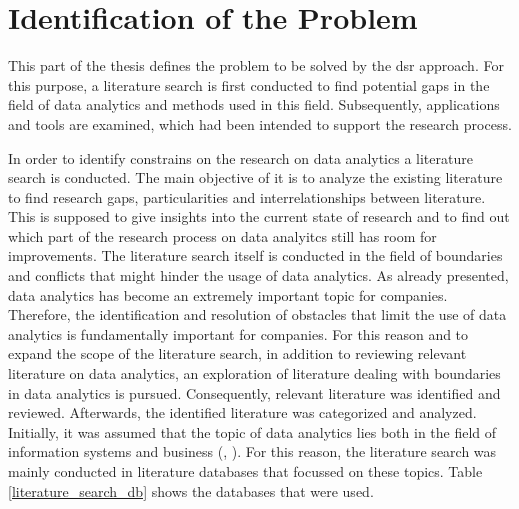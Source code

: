 \newpage\section{Identification of the Problem}\label{sec:identification_of_the_problem}

This part of the thesis defines the problem to be solved by the \ac{dsr} approach. For this purpose, a literature search is first conducted to find potential gaps in the field of data analytics and methods used in this field. Subsequently, applications and tools are examined, which had been intended to support the research process.

In order to identify constrains on the research on data analytics a literature search is conducted. The main objective of it is to analyze the existing literature to find research gaps, particularities and interrelationships between literature. This is supposed to give insights into the current state of research and to find out which part of the research process on data analyitcs still has room for improvements. The literature search itself is conducted in the field of boundaries and conflicts that might hinder the usage of data analytics. As already presented, data analytics has become an extremely important topic for companies. Therefore, the identification and resolution of obstacles that limit the use of data analytics is fundamentally important for companies. For this reason and to expand the scope of the literature search, in addition to reviewing relevant literature on data analytics, an exploration of literature dealing with boundaries in data analytics is pursued. Consequently, relevant literature was identified and reviewed. Afterwards, the identified literature was categorized and analyzed. Initially, it was assumed that the topic of data analytics lies both in the field of information systems and business (\cite{Abbasi.2016}, \cite{Levina.2005}). For this reason, the literature search was mainly conducted in literature databases that focussed on these topics. Table \ref{literature_search_db} shows the databases that were used. 


